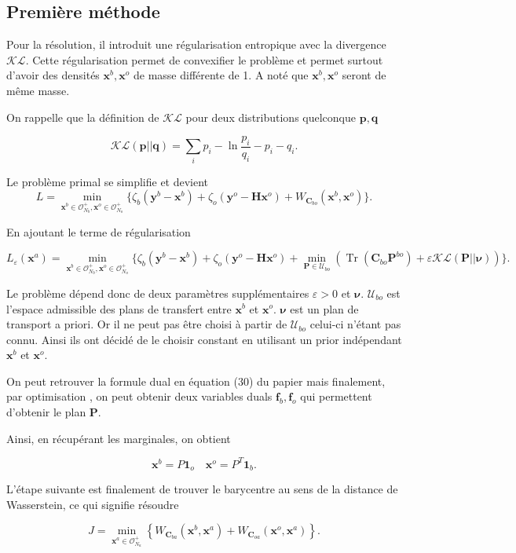 \documentclass{article}
\newcommand{\bH}{\bm{H}}
\newcommand{\bbf}{\bm{f}}
\newcommand{\bnu}{\bm{\nu}}
\newcommand{\bC}{\bm{C}}
\newcommand{\bx}{\bm{x}}
\newcommand{\bP}{\bm{P}}
\newcommand{\by}{\bm{y}}
\DeclareMathOperator{\Tr}{Tr}
\begin{document}
\subsection{Première méthode}
Pour la résolution, il introduit une régularisation entropique avec la divergence $\mathcal{KL}$. Cette régularisation permet de convexifier le problème et permet surtout d'avoir des densités $\bx^b, \bx^o$ de masse différente de 1. A noté que $\bx^b, \bx^o$ seront de même masse.

On rappelle que la définition de $\mathcal{KL}$ pour deux distributions quelconque $\bm{p}, \bm{q}$

$$
    \mathcal{KL}(\bm{p}||\bm{q}) = \sum_i p_i - \ln{\frac{p_i}{q_i}} - p_i - q_i .
$$

Le problème primal se simplifie et devient
$$
    L = \min_{\bx^b \in \mathcal O_{N_b}^+, \bx^o \in \mathcal O_{N_o}^+} \{\zeta_b(\by^b - \bx^b) + \zeta_o(\by^o - \bH \bx^o) + W_{\bC_{bo}}(\bx^b,\bx^o)\}.
$$

En ajoutant le terme de régularisation

$$
    L_\varepsilon(\bx^a) = \min_{\bx^b \in \mathcal O_{N_b}^+, \bx^o \in \mathcal O_{N_o}^+} \{\zeta_b(\by^b - \bx^b) + \zeta_o(\by^o - \bH \bx^o) + \min_{\bP \in \mathcal U_{bo}} \left(\Tr(\bC_{bo} \bP^{bo}) + \varepsilon \mathcal{KL(\bP || \bnu)}\right) \}.
$$

Le problème dépend donc de deux paramètres supplémentaires $\varepsilon > 0$ et $\bnu$. $\mathcal U_{bo}$ est l'espace admissible des plans de transfert entre $\bx^b$ et $\bx^o$. $\bnu$ est un plan de transport a priori. Or il ne peut pas être choisi à partir de $\mathcal{U}_{bo}$ celui-ci n'étant pas connu. Ainsi ils ont décidé de le choisir constant en utilisant un prior indépendant $\bx^b$ et $\bx^o$.

On peut retrouver la formule dual en équation (30) du papier mais finalement, par optimisation , on peut obtenir deux variables duals $\bbf_b, \bbf_o$ qui permettent d'obtenir le plan $\bP$.

Ainsi, en récupérant les marginales, on obtient

$$
    \bx^b = P \bm{1}_o \quad \bx^o = P^T \bm{1}_b.
$$

L'étape suivante est finalement de trouver le barycentre au sens de la distance de Wasserstein, ce qui signifie résoudre

$$
    J = \min_{\bx^a \in \mathcal O^+_{N_a}} \left\{W_{\bC_{ba}}(\bx^b, \bx^a) + W_{\bC_{oa}}(\bx^o, \bx^a)\right\}.
$$
\end{document}
